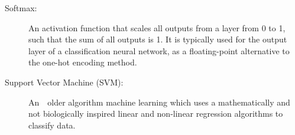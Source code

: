 \documentclass[]{report}
\begin{document}
\begin{description}
\item[Softmax:] An activation function that scales all outputs from a layer from 0 to 1, such that the sum of all outputs is 1. It is typically used for the output layer of a classification neural network, as a floating-point alternative to the one-hot encoding method.

\item[Support Vector Machine (SVM):] An　older algorithm machine learning which uses a mathematically and not biologically inspired linear and non-linear regression algorithms to classify data.
\end{description}
\onecolumn

\printbibliography
\end{document}
